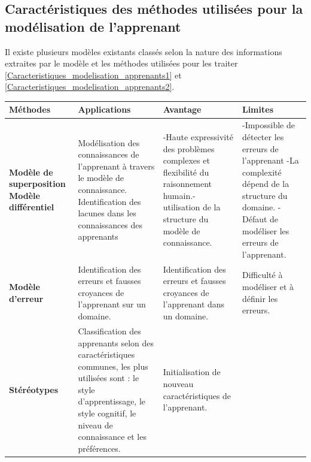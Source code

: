 \subsection{Caractéristiques des méthodes utilisées pour la modélisation de l'apprenant}
Il existe plusieurs modèles existants classés selon la nature des informations extraites par le modèle et les méthodes utilisées pour les traiter \ref{Caracteristiques_modelisation_apprenants1} et \ref{Caracteristiques_modelisation_apprenants2}. \cite{student_model_centered_architecture}

\begin{table}[!htbp]
	\begin{tabular}{|m{3cm}|m{4cm}|m{4cm}|m{4cm}|} %
	\hline
	\rowcolor{blueforest}
	\color{white} \textbf{Méthodes} & \color{white} \textbf{Applications} & \color{white} \textbf{Avantage} & \color{white} \textbf{Limites} \\
	\hline\hline
	\textbf{Modèle de superposition} \newline {------------------} \newline  \textbf{Modèle différentiel}   &
	  Modélisation des connaissances  de l'apprenant à travers   le modèle de connaissance. \newline {-------------------------------} \newline  Identification des lacunes dans les connaissances des apprenants &
	  -Haute expressivité des   problèmes complexes et   flexibilité du raisonnement humain.\newline - utilisation de la structure   du modèle de connaissance.&
	  -Impossible de détecter   les erreurs de l'apprenant \newline -La complexité dépend de   la structure du domaine. \newline  - Défaut de modéliser   les erreurs de l'apprenant. \\ \hline
	  \textbf{Modèle d'erreur}  &
	  Identification des erreurs et fausses croyances de l'apprenant sur un domaine.&
	  Identification des erreurs et fausses croyances de l'apprenant dans un domaine.&
	  Difficulté à modéliser et à définir les erreurs. \\ \hline
	  \textbf{Stéréotypes}  &
	  Classification des apprenants selon des caractéristiques communes, les plus utilisées sont : le style d'apprentissage, le style cognitif, le niveau de connaissance et les préférences.&
	  Initialisation de nouveau caractéristiques de l'apprenant. & \\ \hline

\end{tabular}
\end{table}
